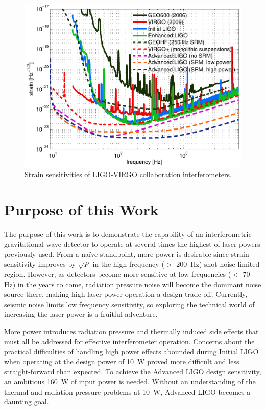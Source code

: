 \begin{figure}
\begin{centering}
\includegraphics[width=1.0\textwidth]{figures/GWnetwork_strains.pdf}
\caption[Strain sensitivities of LIGO-VIRGO collaboration interferometers]{Strain sensitivities of LIGO-VIRGO collaboration interferometers.}
\label{fig:h_all}
\end{centering}
\end{figure}


\section{Purpose of this Work}
The purpose of this work is to demonstrate the capability of an
interferometric gravitational wave detector to operate at several
times the highest of laser powers previously used. From a na\"ive
standpoint, more power is desirable since strain sensitivity improves
by $\sqrt{P}$ in the high frequency ($>$ 200~Hz) shot-noise-limited
region. However, as detectors become more sensitive at low frequencies
($<$ 70 Hz) in the years to come, radiation pressure noise will become
the dominant noise source there, making high laser power operation a
design trade-off. Currently, seismic noise limits low frequency
sensitivity, so exploring the technical world of increasing the laser
power is a fruitful adventure.

More power introduces radiation pressure and thermally induced side
effects that must all be addressed for effective interferometer
operation. Concerns about the practical difficulties of handling high
power effects abounded during Initial LIGO when operating at the
design power of 10~W proved more difficult and less straight-forward
than expected. To achieve the Advanced LIGO design sensitivity, an
ambitious 160~W of input power is needed. Without an understanding of
the thermal and radiation pressure problems at 10~W, Advanced LIGO
becomes a daunting goal.

